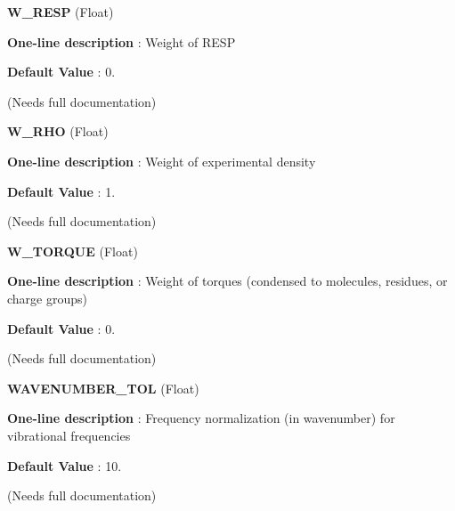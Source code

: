 \begin{DoxyItemize}
\item {\bfseries  \-W\-\_\-\-R\-E\-S\-P } (\-Float) \par
{\bfseries  \-One-\/line description }\-: \-Weight of \-R\-E\-S\-P \par
{\bfseries  \-Default \-Value }\-: 0. \par
(\-Needs full documentation)\end{DoxyItemize}
\begin{DoxyItemize}
\item {\bfseries  \-W\-\_\-\-R\-H\-O } (\-Float) \par
{\bfseries  \-One-\/line description }\-: \-Weight of experimental density \par
{\bfseries  \-Default \-Value }\-: 1. \par
(\-Needs full documentation)\end{DoxyItemize}
\begin{DoxyItemize}
\item {\bfseries  \-W\-\_\-\-T\-O\-R\-Q\-U\-E } (\-Float) \par
{\bfseries  \-One-\/line description }\-: \-Weight of torques (condensed to molecules, residues, or charge groups) \par
{\bfseries  \-Default \-Value }\-: 0. \par
(\-Needs full documentation)\end{DoxyItemize}
\begin{DoxyItemize}
\item {\bfseries  \-W\-A\-V\-E\-N\-U\-M\-B\-E\-R\-\_\-\-T\-O\-L } (\-Float) \par
{\bfseries  \-One-\/line description }\-: \-Frequency normalization (in wavenumber) for vibrational frequencies \par
{\bfseries  \-Default \-Value }\-: 10. \par
(\-Needs full documentation)\end{DoxyItemize}
